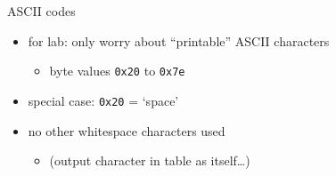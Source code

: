 \begin{frame}{ASCII codes}
\begin{itemize}
\item for lab: only worry about ``printable'' ASCII characters
\begin{itemize}
\item byte values \texttt{0x20} to \texttt{0x7e}
\end{itemize}
\item special case: \texttt{0x20} = `space'
\item no other whitespace characters used
\begin{itemize}
\item (output character in table as itself\ldots)
\end{itemize}
\end{itemize}
\end{frame}
